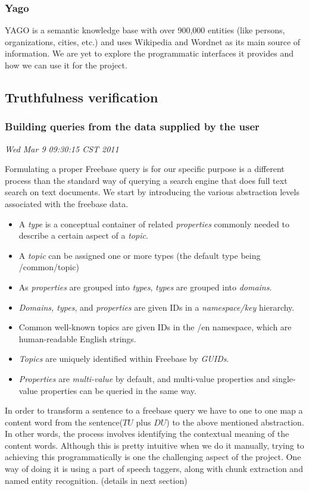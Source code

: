 \documentclass[11pt]{article}
\begin{document}
\subsubsection{Yago}
YAGO is a semantic knowledge base with over 900,000 entities (like persons,
organizations, cities, etc.) and uses Wikipedia and Wordnet as its main source of
information. We are yet to explore the programmatic interfaces it provides and
how we can use it for the project.




\subsection{Truthfulness verification }
\subsubsection {Building queries from the data supplied by the user}

{\em Wed Mar  9 09:30:15 CST 2011}

Formulating a proper Freebase query is for our specific purpose is a different process than the standard way of querying a search engine that does full text search on text documents. We start by introducing the  various abstraction levels associated with the freebase data.
\begin{itemize}
    \item  A {\em type} is a conceptual container of related {\em properties} commonly needed to describe a certain aspect of a {\em topic}.
    \item  A {\em topic} can be assigned one or more types (the default type being /common/topic)
    \item  As {\em properties} are grouped into {\em types}, {\em types} are grouped into {\em domains}.
    \item  {\em Domains, types}, and {\em properties} are given IDs in a {\em namespace/key} hierarchy.
    \item  Common well-known topics are given IDs in the /en namespace, which are human-readable English strings.
    \item  {\em Topics} are uniquely identified within Freebase by {\em GUIDs}.
    \item  {\em Properties} are {\em multi-value} by default, and multi-value properties and single-value properties can be queried in the same way.
\end{itemize}
In order to transform a sentence to a freebase query we have to one to one map a content word from the sentence($TU$ plus $DU$) to the above mentioned abstraction. In other words, the process involves identifying the contextual meaning of the content words. Although this is pretty intuitive when we do it manually, trying to achieving this programmatically is one the challenging aspect of the project. One way of doing it is using a part of speech taggers, along with chunk extraction and named entity recognition. (details in next section) 
\end{document}
